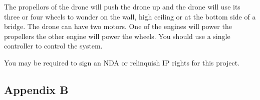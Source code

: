 \documentclass[12pt]{article}
\begin{document}
                The propellors of the drone will push the drone up and the drone will use its three or four wheels to wonder on the wall, high ceiling or at the bottom side of a bridge.
                The drone can have two motors.
                One of the engines will power the propellers the other engine will power the wheels.
                You should use a single controller to control the system.

                You may be required to sign an NDA or relinquish IP rights for this project.
        
        \newpage
        \subsection{Appendix B}
            \newcommand{\ieeestd}[3]{
                \noindent\textbf{#1} \\
                \noindent\url{#2} \\
                \noindent#3 \\
                \vspace{0.5cm}

            }
\end{document}
